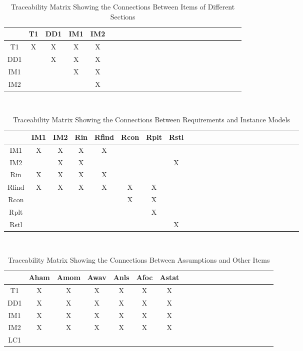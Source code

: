 \documentclass[12pt]{article}
\begin{document}
\begin{table}[h!]
\centering
\begin{tabular}{|c|c|c|c|c|c|c|c|c|c|c|c|c|c|c|c|c|c|c|c|c|c|c|c|}
\hline        
	& T1& DD1& IM1 & IM2 \\
\hline
T1     &X &X &X &X   \\ \hline
DD1    & &X &X &X  \\ \hline
IM1    & & &X &X  \\ \hline 
IM2    & & & &X    \\ 
\hline
\end{tabular}\\
\caption{Traceability Matrix Showing the Connections Between Items of 
Different 
Sections}
\label{Table:B_trace}
\end{table}

\begin{table}[h!]
	\centering
	\begin{tabular}{|c|c|c|c|c|c|c|c|c|c|c|c|c|c|c|c|c|c|c|c|c|c|c|c|}
		\hline        
		& IM1& IM2& Rin & Rfind & Rcon & Rplt & Rstl \\
		\hline
		IM1     &X &X &X &X & & &  \\ \hline
		IM2    & &X &X & & & &X \\ \hline
		Rin    &X &X &X &X & & & \\ \hline 
		Rfind    &X &X &X &X &X &X &    \\ \hline 
		Rcon   & & & & &X &X & \\ \hline
		Rplt   & & & & & &X & \\ \hline
		Rstl   & & & & & & &X \\
		\hline
	\end{tabular}\\
	\caption{Traceability Matrix Showing the Connections Between Requirements 
	and Instance Models}
	\label{Table:R_trace}
\end{table} 

\newpage
\begin{landscape}
	\begin{table}[h!]
		\centering
		\begin{tabular}{|c|c|c|c|c|c|c|c|c|c|c|c|c|c|c|c|c|c|c|c|}
			\hline
			& Aham & Amom& Awav& Anls& Afoc& Astat \\
			\hline
			T1        &X &X &X &X &X& X \\ \hline
			DD1       &X &X &X &X &X &X \\ \hline
			IM1       &X &X &X &X &X &X\\ \hline
			IM2       &X  &X  &X  &X  &X &X \\ \hline
			LC1       & & & & & & \\ 
			\hline
		\end{tabular}
		\caption{Traceability Matrix Showing the Connections Between 
		Assumptions and 
			Other Items}
		\label{Table:A_trace}
	\end{table}
\end{landscape}
\end{document}
